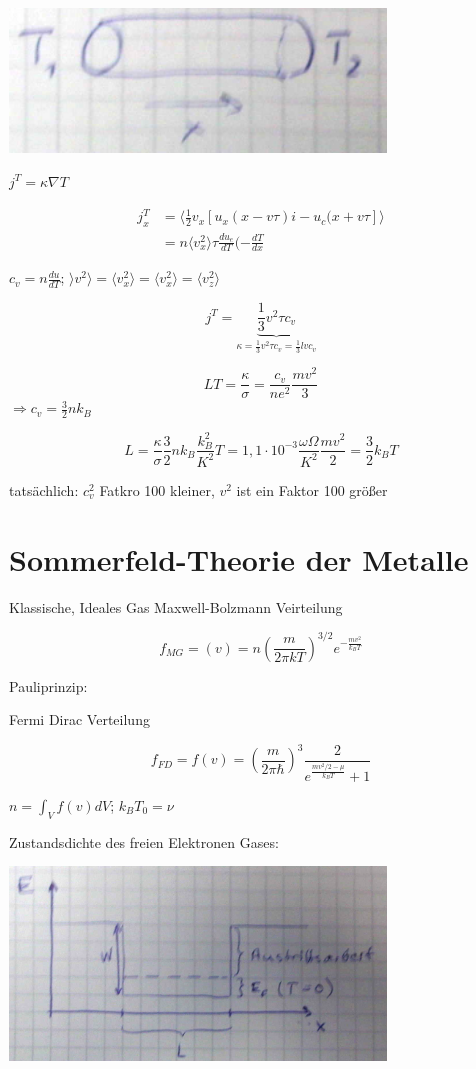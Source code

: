 \includegraphics[width=0.75\textwidth]{kap06_22.png}

\(j^T = \kappa \nabla T\)

\begin{align}
j^T_x &= \langle \frac{1}{2}v_x [u_x(x-v\tau)i-u_c(x+v\tau]\rangle \\
&= n\langle v_x^2\rangle \tau \frac{du_e}{dT}(-\frac{dT}{dx}
\end{align}

\(c_v = n\frac{du}{dT}\); \(\rangle v^2\rangle  = \langle v_x^2\rangle = \langle v^2_x\rangle =\langle v_z^2\rangle \)

\[ j^T = \underbrace{\frac{1}{3}v^2\tau c_v}_{\kappa = \frac{1}{3}v^2\tau c_v=\frac{1}{3}lvc_v} \]

\[ LT =  \frac{\kappa}{\sigma} = \frac{c_v}{ne^2} \frac{mv^2}{3} \]
\(\Rightarrow c_v = \frac{3}{2} nk_B\)

\[ L =\frac{\kappa}{\sigma}\frac{3}{2} nk_B \frac{k^2_B}{K^2} T = 1,1\cdot 10^{-3}\frac{\omega\Omega}{K^2}\frac{mv^2}{2} = \frac{3}{2}k_B T\]

tatsächlich: \(c^2_v\) Fatkro 100 kleiner, \(v^2\) ist ein Faktor 100 größer



\section{Sommerfeld-Theorie der Metalle}

Klassische, Ideales Gas Maxwell-Bolzmann Veirteilung

\[ f_{MG} = (v) = n\left(\frac{m}{2\pi kT}\right)^{3/2}e^{-\frac{mv^2}{k_B T}} \]

Pauliprinzip:

Fermi Dirac Verteilung

\[ f_{FD} = f(v) = \left(\frac{m}{2\pi \hbar}\right)^3 \frac{2}{e^{\frac{mv^2/2-\mu}{k_BT}}+1} \]

\(n=\int_V f(v) dV\); \(k_BT_0 = \nu\)

Zustandsdichte des freien Elektronen Gases:

\includegraphics[width=0.75\textwidth]{kap06_23.png}

